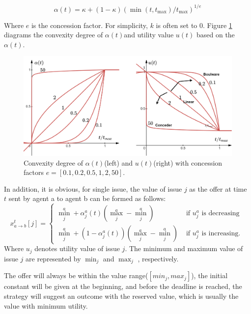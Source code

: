 \begin{equation}
\alpha(t)=\kappa+\left(1-\kappa\right)\left(\min \left(t, t_{\max }\right) / t_{\max }\right)^{1 / e}
\end{equation}

Where $e$ is the concession factor. For simplicity, $k$ is often set to $0$. Figure \ref{fig:boulware-conceder-combination} diagrams the convexity degree of $\alpha(t)$and utility value $u(t)$ based on the $\alpha(t)$.

\begin{figure}
\centering
\includegraphics[width=1.0\textwidth]{./images/conceder-boulware-combination.png}
\caption{Convexity degree of $\alpha(t)$(left) and $u(t)$(right) with concession factors $e=[0.1, 0.2, 0.5, 1, 2, 50]$.}
\label{fig:boulware-conceder-combination}
\end{figure}

In addition, it is obvious, for single issue, the value of issue $j$ as the offer at time $t$ sent by agent a to agent b can be formed as follows:
\begin{equation}
x_{a \rightarrow b}^{t}[j]=\left\{\begin{array}{ll}
\min _{j}^{a}+\alpha_{j}^{a}(t)\left(\max _{j}^{a}-\min _{j}^{a}\right) & \text { if } u_{j}^{a} \text { is decreasing } \\
\min _{j}^{a}+\left(1-\alpha_{j}^{a}(t)\right)\left(\max _{j}^{a}-\min _{j}^{a}\right) & \text { if } u_{j}^{a} \text { is increasing. }
\end{array}\right.
\end{equation}
Where $u_{j}$ denotes utility value of issue $j$. The minimum and maximum value of issue $j$ are represented by $\min _{j}$ and $\max _{j}$ , respectively.

The offer will always be within the value range($[min_j, max_j]$), the initial constant will be given at the beginning, and before the deadline is reached, the strategy will suggest an outcome with the reserved value, which is usually the value with minimum utility.

